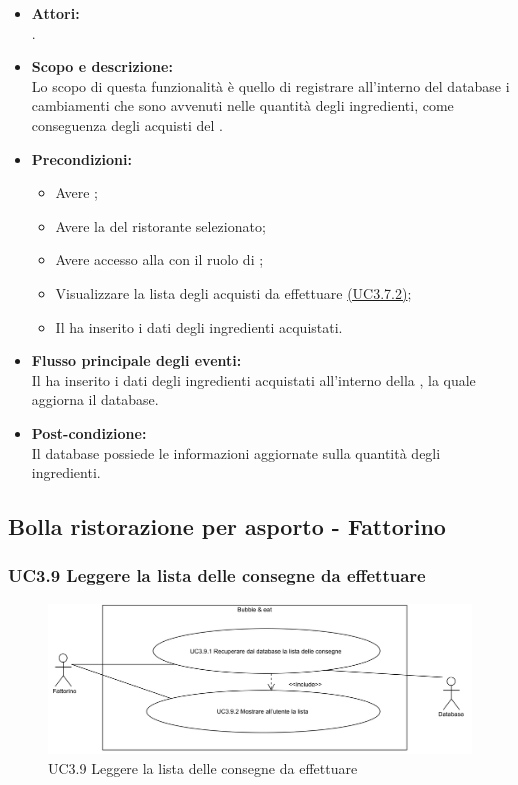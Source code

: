 \begin{itemize}
	\item \textbf{Attori:}
	\\.
	\item \textbf{Scopo e descrizione:} 
	\\Lo scopo di questa funzionalità è quello di registrare all'interno del database i cambiamenti che sono avvenuti nelle quantità degli ingredienti, come conseguenza degli acquisti del .
	\item \textbf{Precondizioni:}
	\begin{itemize}
		\item Avere ;
		\item Avere la  del ristorante selezionato;
		\item Avere accesso alla  con il ruolo di ;
		\item Visualizzare la lista degli acquisti da effettuare \hyperref[UC3.7.2]{(UC3.7.2)};
		\item Il  ha inserito i dati degli ingredienti acquistati.
	\end{itemize}
	\item \textbf{Flusso principale degli eventi:}
	\\Il {} ha inserito i dati degli ingredienti acquistati all'interno della , la quale aggiorna il database.
	\item \textbf{Post-condizione:}
	\\Il database possiede le informazioni aggiornate sulla quantità degli ingredienti.
\end{itemize}

\subsection{Bolla ristorazione per asporto - Fattorino}

\subsubsection{UC3.9 Leggere la lista delle consegne da effettuare} \label{UC3.9}

\begin{figure}[H]
	\centering
	\includegraphics[width=15cm]{../../documenti/AnalisiDeiRequisiti/Diagrammi_img/uc3_9.png}
	\caption{UC3.9 Leggere la lista delle consegne da effettuare}
\end{figure}

